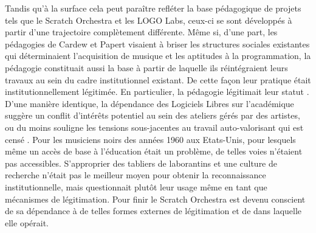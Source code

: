 {

Tandis qu'\`a la surface cela peut para\^itre refl\'eter la base
p\'edagogique de projets tels que le Scratch Orchestra et les LOGO
Labs, ceux{}-ci se sont d\'evelopp\'es \`a partir d'une trajectoire
compl\`etement diff\'erente. M\^eme si, d'une part, les p\'edagogies de
Cardew et Papert visaient \`a briser les structures sociales existantes
qui d\'eterminaient l'acquisition de musique et les aptitudes \`a la
programmation, la p\'edagogie constituait aussi la base \`a partir de
laquelle ils r\'eint\'egraient leurs travaux au sein du cadre
institutionnel existant. De cette fa\c{c}on leur pratique \'etait
institutionnellement l\'egitim\'ee. En particulier, la p\'edagogie
l\'egitimait leur statut . D'une mani\`ere identique,
la d\'ependance des Logiciels Libres sur l'acad\'emique sugg\`ere un
conflit d'int\'er\^ets potentiel au sein des ateliers g\'er\'es par des
artistes, ou du moins souligne les tensions sous{}-jacentes au travail
auto{}-valorisant qui est cens\'e . Pour les musiciens
noirs des ann\'ees 1960 aux Etats{}-Unis, pour lesquels m\^eme un
acc\`es de base \`a l'\'education \'etait un probl\`eme, de telles
voies n'\'etaient pas accessibles. S'approprier des tabliers 
de laborantins et une culture de recherche n'\'etait pas le meilleur
moyen pour obtenir la reconnaissance institutionnelle, mais
questionnait plut\^ot leur usage m\^eme en tant que m\'ecanismes de
l\'egitimation. Pour finir le Scratch Orchestra est devenu conscient de
sa d\'ependance \`a de telles formes externes de l\'egitimation et de
 dans laquelle elle op\'erait.


}
